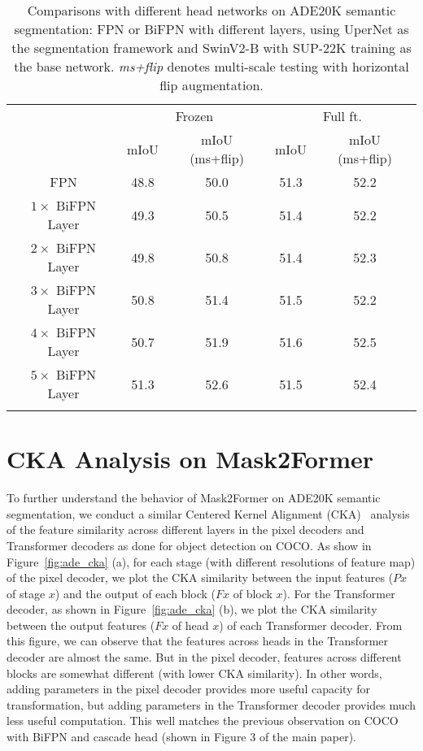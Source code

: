 \documentclass{article}
\begin{document}
\begin{table}[h]
        \centering
        \addtolength{\tabcolsep}{3.0pt}
        \begin{tabular}{c|cc|cc}
            \Xhline{1.0pt}
            \multirow{2}{*}{Head Network} & \multicolumn{2}{c|}{Frozen} & \multicolumn{2}{c}{Full ft.} \\
             & mIoU & mIoU (ms+flip) & mIoU & mIoU (ms+flip) \\
            \hline
            FPN & 48.8 & 50.0 & 51.3 & 52.2 \\
            $1\times$ BiFPN Layer & 49.3 & 50.5 & 51.4 & 52.2  \\
            $2\times$ BiFPN Layer & 49.8 & 50.8 & 51.4 & 52.3 \\
            $3\times$ BiFPN Layer & 50.8 & 51.4 & 51.5 & 52.2 \\
            $4\times$ BiFPN Layer & 50.7 & 51.9 & 51.6 & 52.5 \\
            $5\times$ BiFPN Layer & 51.3 & 52.6 & 51.5 & 52.4 \\
          \Xhline{1.0pt}  
       \end{tabular}
       \caption{Comparisons with different head networks on ADE20K semantic segmentation: FPN or BiFPN with different layers, using UperNet as the segmentation framework and SwinV2-B with SUP-22K training as the base network. \emph{ms+flip} denotes multi-scale testing with horizontal flip augmentation.}
    \label{tab:upernet_param_at_head_ade}
\end{table}

\section{CKA Analysis on Mask2Former}
To further understand the behavior of Mask2Former on ADE20K semantic segmentation, we conduct a similar Centered Kernel Alignment (CKA)~\cite{cka} analysis of the feature similarity across different layers in the pixel decoders and Transformer decoders as done for object detection on COCO. As show in Figure~\ref{fig:ade_cka} (a), for each stage (with different resolutions of feature map) of the pixel decoder, we plot the CKA similarity between the input features ($Px$ of stage $x$) and the output of each block ($Fx$ of block $x$). For the Transformer decoder, as shown in Figure~\ref{fig:ade_cka} (b), we plot the CKA similarity between the output features ($Fx$ of head $x$) of each Transformer decoder. 
From this figure, we can observe that the features across heads in the Transformer decoder are almost the same. But in the pixel decoder, features across different blocks are somewhat different (with lower CKA similarity). In other words, adding parameters in the pixel decoder provides more useful capacity for transformation, but adding parameters in the Transformer decoder provides much less useful computation. This well matches the previous observation on COCO with BiFPN and cascade head (shown in Figure 3 of the main paper).
\end{document}
